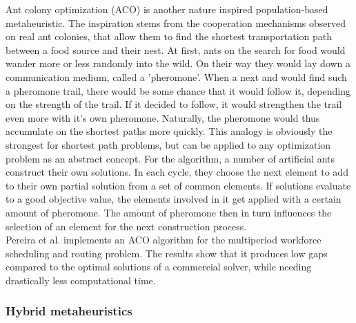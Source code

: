 Ant colony optimization (ACO) is another nature inspired population-based metaheuristic. The inspiration stems from the cooperation mechanisms observed on real ant colonies, that allow them to find the shortest transportation path between a food source and their nest. At first, ants on the search for food would wander more or less randomly into the wild. On their way they would lay down a communication medium, called a 'pheromone'. When a next and would find such a pheromone trail, there would be some chance that it would follow it, depending on the strength of the trail. If it decided to follow, it would strengthen the trail even more with it's own pheromone. Naturally, the pheromone would thus accumulate on the shortest paths more quickly. This analogy is obviously the strongest for shortest path problems, but can be applied to any optimization problem as an abstract concept. For the algorithm, a number of artificial ants construct their own solutions. In each cycle, they choose the next element to add to their own partial solution from a set of common elements. If solutions evaluate to a good objective value, the elements involved in it get applied with a certain amount of pheromone. The amount of pheromone then in turn influences the selection of an element for the next construction process.\\
Pereira et al. \cite{pereira_multiperiod_2020} implements an ACO algorithm for the multiperiod workforce scheduling and routing problem. The results show that it produces low gaps compared to the optimal solutions of a commercial solver, while needing drastically less computational time.

\subsubsection{Hybrid metaheuristics}

